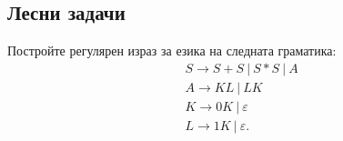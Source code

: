 \subsection{Лесни задачи}

\begin{extra}

\begin{problem}
  Постройте регулярен израз за езика на следната граматика:
  \begin{align*}
    & S \to S + S\ |\ S * S\ |\ A\\
    & A \to KL\ |\ LK\\
    & K \to 0K\ |\ \varepsilon\\
    & L \to 1K\ |\ \varepsilon.
  \end{align*}
\end{problem}


\end{extra}
